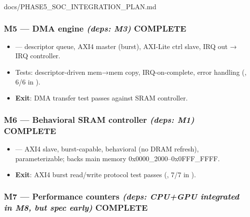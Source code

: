 \begin{relocated}{docs/PHASE5_SOC_INTEGRATION_PLAN.md}
\subsubsection{\texorpdfstring{M5 --- DMA engine \emph{(deps: M3)} \ok{}
COMPLETE}{M5 --- DMA engine (deps: M3)  COMPLETE}}\label{ds:ch:phase5-soc-integration-plan:m5-dma-engine-deps-m3-white-check-mark-complete}

\begin{itemize}
\tightlist
\item
  \ok{}  --- descriptor queue, AXI4 master
  (burst), AXI-Lite ctrl slave, IRQ out → IRQ controller.
\item
  \ok{} Tests: descriptor-driven mem→mem copy, IRQ-on-complete, error
  handling (, 6/6 in ).
\item
  \textbf{Exit}: \ok{} DMA transfer test passes against SRAM controller.
\end{itemize}

\subsubsection{\texorpdfstring{M6 --- Behavioral SRAM controller
\emph{(deps: M1)} \ok{}
COMPLETE}{M6 --- Behavioral SRAM controller (deps: M1)  COMPLETE}}\label{ds:ch:phase5-soc-integration-plan:m6-behavioral-sram-controller-deps-m1-white-check-mark-complete}

\begin{itemize}
\tightlist
\item
  \ok{}  --- AXI4 slave, burst-capable,
  behavioral (no DRAM refresh), parameterizable; backs main memory
  0x0000\_\allowbreak{}2000--0x0FFF\_\allowbreak{}FFFF.
\item
  \textbf{Exit}: \ok{} AXI4 burst read/\allowbreak{}write protocol test
  passes (, 7/7 in ).
\end{itemize}

\subsubsection{\texorpdfstring{M7 --- Performance counters \emph{(deps:
CPU+GPU integrated in M8, but spec early)} \ok{}
COMPLETE}{M7 --- Performance counters (deps: CPU+GPU integrated in M8, but spec early)  COMPLETE}}\label{ds:ch:phase5-soc-integration-plan:m7-performance-counters-deps-cpugpu-integrated-in-m8-but-spec-early-white-check-mark-complete}


\end{relocated}
